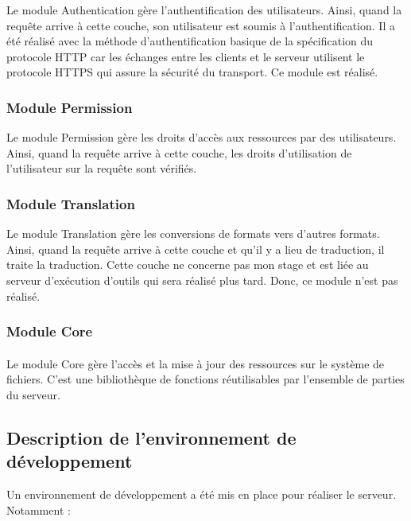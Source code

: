 \documentclass{report}
\begin{document}
Le module Authentication gère l'authentification des utilisateurs. Ainsi, quand la requête arrive à cette couche, son
utilisateur est soumis à l'authentification. Il a été réalisé avec la méthode d'authentification basique de la spécification
du protocole HTTP car les échanges entre les clients et le serveur utilisent le protocole HTTPS qui assure la sécurité
du transport. Ce module est réalisé.

\subsubsection{Module Permission}

Le module Permission gère les droits d'accès aux ressources par des utilisateurs. Ainsi, quand la requête arrive
à cette couche, les droits d'utilisation de l'utilisateur sur la requête sont vérifiés. 

\subsubsection{Module Translation}

Le module Translation gère les conversions de formats vers d'autres formats. Ainsi, quand la requête arrive
à cette couche et qu'il y a lieu de traduction, il traite la traduction. Cette couche ne concerne pas
mon stage et est liée au serveur d'exécution d'outils qui sera réalisé plus tard. Donc, ce module n'est pas réalisé.

\subsubsection{Module Core}

\paragraph{}
Le module Core gère l'accès et la mise à jour des ressources sur le système de fichiers. C'est une bibliothèque de 
fonctions réutilisables par l'ensemble de parties du serveur.

\subsection{Description de l'environnement de développement}

Un environnement de développement a été mis en place pour réaliser le serveur. Notamment :
\end{document}

